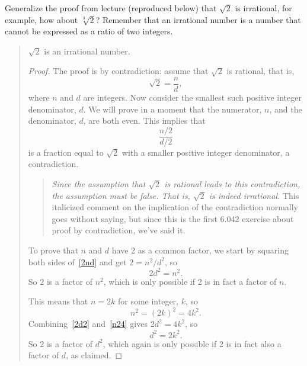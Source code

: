 \documentclass[handout]{mcs}
\begin{document}


\begin{problem}\label{generprob}
  Generalize the proof from lecture (reproduced below) that $\sqrt{2}$ is
  irrational, for example, how about $\sqrt[3]{2}$?  Remember that an
  irrational number is a number that cannot be expressed as a ratio of two
  integers.

\begin{quote}

\begin{theorem*}
$\sqrt{2}$ is an irrational number.
\end{theorem*}

\begin{proof}
  The proof is by contradiction: assume that $\sqrt{2}$ is rational, that
  is,
  \begin{equation}\label{2nd}
    \sqrt{2} = \frac{n}{d},
  \end{equation}
  where $n$ and $d$ are integers.  Now consider the smallest such positive
  integer denominator, $d$.  We will prove in a moment that the numerator,
  $n$, and the denominator, $d$, are both even.  This implies that
         \[
        \frac{n/2}{d/2}
        \]
  is a fraction equal to $\sqrt{2}$ with a smaller positive integer
  denominator, a contradiction.

\begin{quote}
\emph{Since the assumption that $\sqrt{2}$ is rational leads to this
  contradiction, the assumption must be false.  That is, $\sqrt{2}$ is
  indeed irrational.}  This italicized comment on the implication of the
contradiction normally goes without saying, but since this is the first
6.042 exercise about proof by contradiction, we've said it.
\end{quote}

  To prove that $n$ and $d$ have 2 as a common factor, we start by
  squaring both sides of~\eqref{2nd} and get $2 = n^2 / d^2$, so
\begin{equation}\label{2d2}
2 d^2 = n^2.
\end{equation}
So 2 is a factor of $n^2$, which is only possible if 2 is in fact a
factor of $n$.

This means that $n=2k$ for some integer, $k$, so
\begin{equation}\label{n24}
  n^2 = (2k)^2 = 4 k^2.
\end{equation}
Combining~\eqref{2d2} and~\eqref{n24} gives $2 d^2 = 4 k^2$, so
\begin{equation}\label{n22}
d^2 = 2k^2.
\end{equation}
So 2 is a factor of $d^2$, which again is only possible if 2 is in fact
also a factor of $d$, as claimed.
\end{proof}
\end{quote}


\end{problem}
\end{document}
